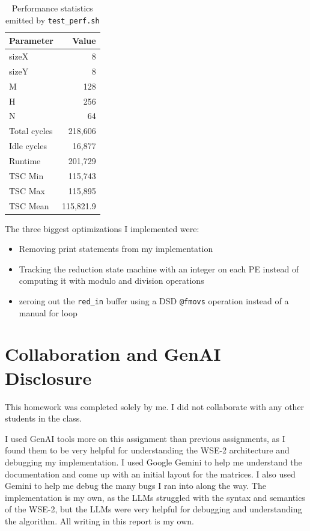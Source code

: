 \documentclass[sigconf]{acmart}
\begin{document}
\vspace{-1.5em}

\begin{table}[h!]
\centering
\begin{tabular}{|l|r|}
\hline
\textbf{Parameter} & \textbf{Value} \\
\hline
sizeX & 8 \\
sizeY & 8 \\
M     & 128 \\
H     & 256 \\
N     & 64 \\
Total cycles & 218,606 \\
Idle cycles  & 16,877 \\
Runtime      & 201,729 \\
TSC Min      & 115,743 \\
TSC Max      & 115,895 \\
TSC Mean     & 115,821.9 \\
\hline
\end{tabular}
\caption{Performance statistics emitted by \texttt{test\_perf.sh}}
\label{tab:test_perf}
\end{table}

\vspace{-2.5em}

The three biggest optimizations I implemented were: 

\begin{itemize}
  \item Removing print statements from my implementation
  \item Tracking the reduction state machine with an integer on each PE instead
  of computing it with modulo and division operations
  \item zeroing out the \texttt{red\_in} buffer using a DSD \texttt{@fmovs} operation
 instead of a manual for loop
\end{itemize}

\vspace{-0.5em}
\section{Collaboration and GenAI Disclosure}

This homework was completed solely by me. I did not collaborate with any other
students in the class.

I used GenAI tools more on this assignment than previous assignments, as I
found them to be very helpful for understanding the WSE-2 architecture and
debugging my implementation. I used Google Gemini to help me understand the
documentation and come up with an initial layout for the matrices. I also used
Gemini to help me debug the many bugs I ran into along the way. The implementation
is my own, as the LLMs struggled with the syntax and semantics of the WSE-2, but
the LLMs were very helpful for debugging and understanding the algorithm. All
writing in this report is my own.



\end{document}
